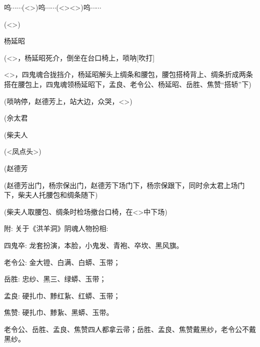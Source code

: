 {呜$\cdots{}\cdots{}$(}\textless{}\!\textgreater{}{)呜$\cdots{}\cdots{}$(}\textless{}\!\textgreater{}\textless{}\!\textgreater{}{)呜$\cdots{}\cdots{}$}

{(}\textless{}\!\textgreater{})

杨延昭\hspace{20pt}~


(\textless{}\!\textgreater{}，杨延昭死介，倒坐在台口椅上，{唢呐}{[}{吹打}{]}

\textless{}\!\textgreater{}，四鬼魂合拢挡介，杨延昭解头上绸条和腰包，腰包搭椅背上、绸条折成两条搭在腰包上，四鬼魂领杨延昭下，孟良、老令公、杨延昭、岳胜、焦赞``搭轿''下)

({唢呐}停，赵德芳上，站大边，众哭，\textless{}\!\textgreater{})

(佘太君\hspace{20pt}~


(柴夫人\hspace{20pt}~


({\textless{}凤点头\textgreater{}})

(赵德芳\hspace{20pt}~


(赵德芳出门，杨宗保出门，赵德芳下场门下，杨宗保跟下，同时佘太君上场门下，柴夫人托腰包和绸条随下)

(柴夫人取腰包、绸条时检场撤台口椅，在\textless{}\!\textgreater{}中下场)

{附}: 关于《洪羊洞》阴魂人物扮相: 

{四鬼卒}: 龙套扮演，本脸，小鬼发、青袍、卒坎、黑风旗。

{老令公}: 金大镫、白满、白蟒、玉带；

{岳胜}: 忠纱、黑三、绿蟒、玉带；

{孟良}: 硬扎巾、黪红紥、红蟒、玉带；

{焦赞}: 硬扎巾、黪紥、黑蟒、玉带。

老令公、岳胜、孟良、焦赞{四人都拿云帚}；岳胜、孟良、焦赞{戴黑纱}，老令公{不戴黑纱}。

